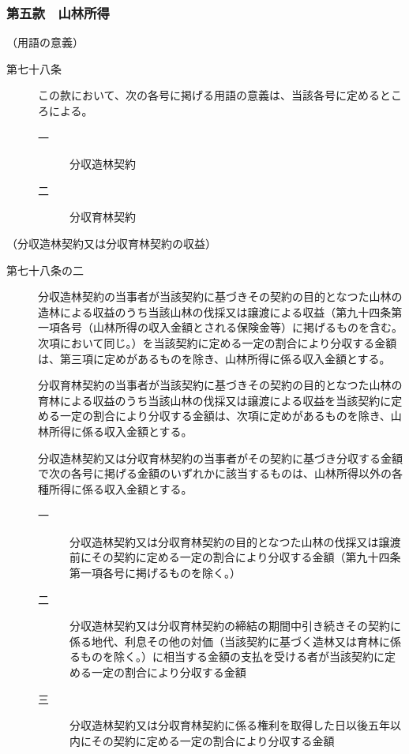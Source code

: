 \documentclass[twocolumn,a4j,10pt]{ltjtarticle}
\begin{document}
\subsubsection*{第五款　山林所得}
\noindent\hspace{10pt}（用語の意義）
\begin{description}
\item[第七十八条]この款において、次の各号に掲げる用語の意義は、当該各号に定めるところによる。
\begin{description}
\item[一]分収造林契約
\item[二]分収育林契約
\end{description}
\end{description}
\noindent\hspace{10pt}（分収造林契約又は分収育林契約の収益）
\begin{description}
\item[第七十八条の二]分収造林契約の当事者が当該契約に基づきその契約の目的となつた山林の造林による収益のうち当該山林の伐採又は譲渡による収益（第九十四条第一項各号（山林所得の収入金額とされる保険金等）に掲げるものを含む。次項において同じ。）を当該契約に定める一定の割合により分収する金額は、第三項に定めがあるものを除き、山林所得に係る収入金額とする。
\item[]分収育林契約の当事者が当該契約に基づきその契約の目的となつた山林の育林による収益のうち当該山林の伐採又は譲渡による収益を当該契約に定める一定の割合により分収する金額は、次項に定めがあるものを除き、山林所得に係る収入金額とする。
\item[]分収造林契約又は分収育林契約の当事者がその契約に基づき分収する金額で次の各号に掲げる金額のいずれかに該当するものは、山林所得以外の各種所得に係る収入金額とする。
\begin{description}
\item[一]分収造林契約又は分収育林契約の目的となつた山林の伐採又は譲渡前にその契約に定める一定の割合により分収する金額（第九十四条第一項各号に掲げるものを除く。）
\item[二]分収造林契約又は分収育林契約の締結の期間中引き続きその契約に係る地代、利息その他の対価（当該契約に基づく造林又は育林に係るものを除く。）に相当する金額の支払を受ける者が当該契約に定める一定の割合により分収する金額
\item[三]分収造林契約又は分収育林契約に係る権利を取得した日以後五年以内にその契約に定める一定の割合により分収する金額
\end{description}
\end{description}
\end{document}
